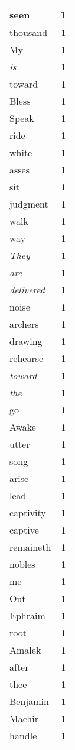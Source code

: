 \begin{center}
\begin{longtable}{l|r}
seen & 1\\ \hline 
thousand & 1\\ \hline 
My & 1\\ \hline 
\emph{is} & 1\\ \hline 
toward & 1\\ \hline 
Bless & 1\\ \hline 
Speak & 1\\ \hline 
ride & 1\\ \hline 
white & 1\\ \hline 
asses & 1\\ \hline 
sit & 1\\ \hline 
judgment & 1\\ \hline 
walk & 1\\ \hline 
way & 1\\ \hline 
\emph{They} & 1\\ \hline 
\emph{are} & 1\\ \hline 
\emph{delivered} & 1\\ \hline 
noise & 1\\ \hline 
archers & 1\\ \hline 
drawing & 1\\ \hline 
rehearse & 1\\ \hline 
\emph{toward} & 1\\ \hline 
\emph{the} & 1\\ \hline 
go & 1\\ \hline 
Awake & 1\\ \hline 
utter & 1\\ \hline 
song & 1\\ \hline 
arise & 1\\ \hline 
lead & 1\\ \hline 
captivity & 1\\ \hline 
captive & 1\\ \hline 
remaineth & 1\\ \hline 
nobles & 1\\ \hline 
me & 1\\ \hline 
Out & 1\\ \hline 
Ephraim & 1\\ \hline 
root & 1\\ \hline 
Amalek & 1\\ \hline 
after & 1\\ \hline 
thee & 1\\ \hline 
Benjamin & 1\\ \hline 
Machir & 1\\ \hline 
handle & 1\\ \hline 

\end{longtable}
\end{center}

